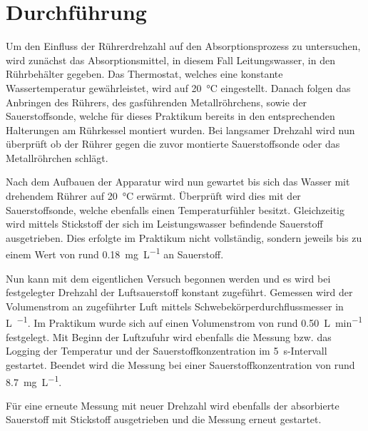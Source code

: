 \section{Durchführung}
\label{sec:durchfuerung}

Um den Einfluss der Rührerdrehzahl auf den Absorptionsprozess zu untersuchen, wird zunächst das Absorptionsmittel, in diesem Fall Leitungswasser, in den Rührbehälter gegeben.
Das Thermostat, welches eine konstante Wassertemperatur gewährleistet, wird auf \SI{20}{\celsius} eingestellt. Danach folgen das Anbringen des Rührers, des gasführenden Metallröhrchens, sowie der Sauerstoffsonde, welche für dieses Praktikum bereits in den entsprechenden Halterungen am Rührkessel montiert wurden. 
Bei langsamer Drehzahl wird nun überprüft ob der Rührer gegen die zuvor montierte Sauerstoffsonde oder das Metallröhrchen schlägt.

Nach dem Aufbauen der Apparatur wird nun gewartet bis sich das Wasser mit drehendem Rührer auf \SI{20}{\celsius} erwärmt. Überprüft wird dies mit der Sauerstoffsonde, welche ebenfalls einen Temperaturfühler besitzt.
Gleichzeitig wird mittels Stickstoff der sich im Leistungswasser befindende Sauerstoff ausgetrieben. Dies erfolgte im Praktikum nicht vollständig, sondern jeweils bis zu einem Wert von rund \SI{0,18}{\milli \gram \per \liter} an Sauerstoff.

Nun kann mit dem eigentlichen Versuch begonnen werden und es wird bei festgelegter Drehzahl der Luftsauerstoff konstant zugeführt. Gemessen wird der Volumenstrom an zugeführter Luft mittels Schwebekörperdurchflussmesser in \si{\liter \per \min}. Im Praktikum wurde sich auf einen Volumenstrom von rund \SI{0,50}{\liter \per \minute} festgelegt.
Mit Beginn der Luftzufuhr wird ebenfalls die Messung bzw. das Logging der Temperatur und der Sauerstoffkonzentration im \SI{5}{\second}-Intervall gestartet.
Beendet wird die Messung bei einer Sauerstoffkonzentration von rund \SI{8,7}{\milli\gram \per \liter}.

Für eine erneute Messung mit neuer Drehzahl wird ebenfalls der absorbierte Sauerstoff mit Stickstoff ausgetrieben und die Messung erneut gestartet.